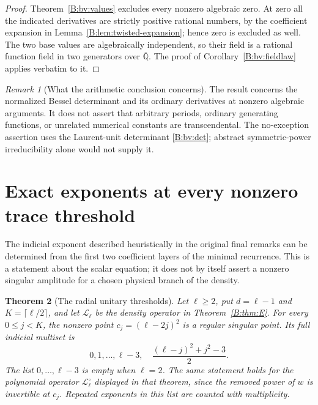 \documentclass[11pt,a4paper]{article}
\newtheorem{theorem}{Theorem}[section]
\theoremstyle{definition}
\theoremstyle{remark}
\newtheorem{remark}[theorem]{Remark}
\numberwithin{equation}{section}
\begin{document}
\begin{proof}
Theorem~\ref{B:bv:values} excludes every nonzero algebraic zero.
At zero all the indicated derivatives are strictly positive
rational numbers, by the coefficient expansion in
Lemma~\ref{B:lem:twisted-expansion}; hence zero is excluded as well.
The two base values are algebraically independent, so their
field is a rational function field in two generators over
$\overline{\mathbb Q}$. The proof of
Corollary~\ref{B:bv:fieldlaw} applies verbatim to it.
\end{proof}

\begin{remark}[What the arithmetic conclusion concerns]
The result concerns the normalized Bessel determinant and its
ordinary derivatives at nonzero algebraic arguments. It does
not assert that arbitrary periods, ordinary generating functions,
or unrelated numerical constants are transcendental. The
no-exception assertion uses the Laurent-unit determinant
\eqref{B:bv:det}; abstract symmetric-power irreducibility alone
would not supply it.
\end{remark}

\section{Exact exponents at every nonzero trace threshold}
\label{B:upden:section}

The indicial exponent described heuristically in the original final
remarks can be determined from the first two coefficient layers of the
minimal recurrence.  This is a statement about the scalar equation;
it does not by itself assert a nonzero singular amplitude for a chosen
physical branch of the density.

\begin{theorem}[The radial unitary thresholds]\label{B:upden:unitary}
Let $\ell\ge2$, put $d=\ell-1$ and $K=\lceil\ell/2\rceil$, and let
$\mathcal L_\ell$ be the density operator in Theorem~\ref{B:thm:E}.
For every $0\le j<K$, the nonzero point $c_j=(\ell-2j)^2$ is a
regular singular point. Its full indicial multiset is
\[
 0,1,\ldots,\ell-3,
 \quad \frac{(\ell-j)^2+j^2-3}{2}.
\]
The list $0,\ldots,\ell-3$ is empty when $\ell=2$.
The same statement holds for the polynomial operator
$\mathcal L_\ell^\circ$ displayed in that theorem, since the removed
power of $w$ is invertible at $c_j$. Repeated exponents in this list
are counted with multiplicity.
\end{theorem}
\end{document}
